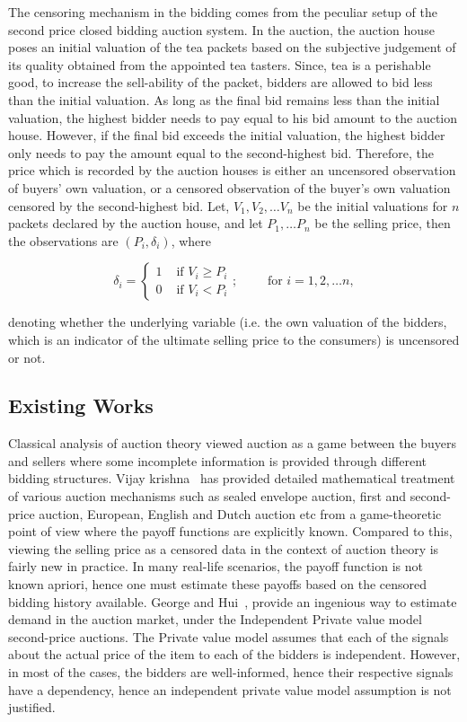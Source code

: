\documentclass[a4paper,12pt]{article}
\begin{document}
The censoring mechanism in the bidding comes from the peculiar setup of the second price closed bidding auction system. In the auction, the auction house poses an initial valuation of the tea packets based on the subjective judgement of its quality obtained from the appointed tea tasters. Since, tea is a perishable good, to increase the sell-ability of the packet, bidders are allowed to bid less than the initial valuation. As long as the final bid remains less than the initial valuation, the highest bidder needs to pay equal to his bid amount to the auction house. However, if the final bid exceeds the initial valuation, the highest bidder only needs to pay the amount equal to the second-highest bid. Therefore, the price which is recorded by the auction houses is either an uncensored observation of buyers' own valuation, or a censored observation of the buyer's own valuation censored by the second-highest bid. Let, $V_1, V_2, \dots V_n$ be the initial valuations for $n$ packets declared by the auction house, and let $P_1, \dots P_n$ be the selling price, then the observations are $(P_i, \delta_i)$, where 

\begin{equation}
\delta_i = \begin{cases}
    1 & \text{ if } V_i \geq P_i\\
    0 & \text{ if } V_i < P_i
\end{cases}; \qquad \text{ for } i =1, 2, \dots n,
\label{eqn:delta-i}
\end{equation}


\noindent denoting whether the underlying variable (i.e. the own valuation of the bidders, which is an indicator of the ultimate selling price to the consumers) is uncensored or not. 

\subsection{Existing Works}

Classical analysis of auction theory viewed auction as a game between the buyers and sellers where some incomplete information is provided through different bidding structures. Vijay krishna~\cite{krishna2009auction} has provided detailed mathematical treatment of various auction mechanisms such as sealed envelope auction, first and second-price auction, European, English and Dutch auction etc from a game-theoretic point of view where the payoff functions are explicitly known. Compared to this, viewing the selling price as a censored data in the context of auction theory is fairly new in practice. In many real-life scenarios, the payoff function is not known apriori, hence one must estimate these payoffs based on the censored bidding history available. George and Hui~\cite{george2012optimal}, provide an ingenious way to estimate demand in the auction market, under the Independent Private value model second-price auctions. The Private value model assumes that each of the signals about the actual price of the item to each of the bidders is independent. However, in most of the cases, the bidders are well-informed, hence their respective signals have a dependency, hence an independent private value model assumption is not justified.
\end{document}
